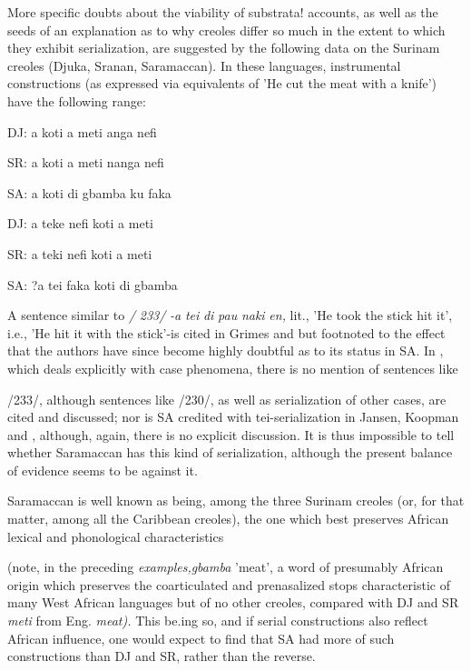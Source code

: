 More specific doubts about the viability of substrata! accounts, as well as the seeds of an explanation as to why creoles differ so much in the extent to which they exhibit serialization, are suggested by the following data on the Surinam creoles (Djuka, Sranan, Saramaccan). In these languages, instrumental constructions (as expressed via equiva\-lents of 'He cut the meat with a knife') have the following range:

\ea\label{ex:228}
 DJ: a koti a meti anga nefi
\glt
\z

\ea\label{ex:229}
 SR: a koti a meti nanga nefi
\glt
\z

\ea\label{ex:230}
 SA: a koti di gbamba ku faka
\glt
\z

\ea\label{ex:231}
 DJ: a teke nefi koti a meti
\glt
\z

\ea\label{ex:232}
 SR: a teki nefi koti a meti
\glt
\z

\ea\label{ex:233}
 SA: ?a tei faka koti di gbamba
\glt
\z

A sentence similar to \textit{/} \textit{233/} \textit{{}-}\textit{a} \textit{tei} \textit{di} \textit{pau} \textit{naki} \textit{en,} lit., 'He took the stick hit it', i.e., 'He hit it with the stick'{}-is cited in Grimes and \citet{Glock1970} but footnoted to the effect that the authors have since become highly doubtful as to its status in SA. In \citet{Glock1972}, which deals explicitly with case phenomena, there is no mention of sentences like

/233/, although sentences like /230/, as well as serialization of other cases, are cited and discussed; nor is SA credited with tei-serialization in Jansen, Koopman and \citet{Muysken1978}, although, again, there is no explicit discussion. It is thus impossible to tell whether Saramaccan has this kind of serialization, although the present balance of evidence seems to be against it.

Saramaccan is well known as being, among the three Surinam creoles (or, for that matter, among all the Caribbean creoles), the one which best preserves African lexical and phonological characteristics


(note, in the preceding \textit{examples,gbamba} 'meat', a word of presumably African origin which preserves the coarticulated and prenasalized stops characteristic of many West African languages but of no other creoles, compared with DJ and SR \textit{meti} from Eng. \textit{meat).} This be.ing so, and if serial constructions also reflect African influence, one would expect to find that SA had more of such constructions than DJ and SR, rather than the reverse.

